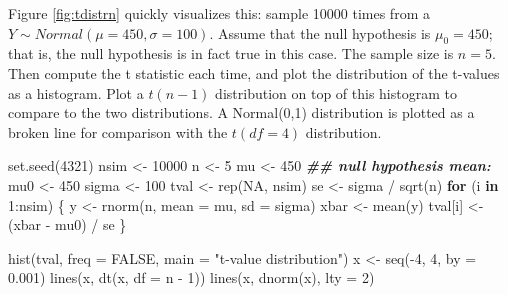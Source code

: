 \documentclass[
  12pt,
]{krantz}
\newenvironment{Shaded}{\begin{snugshade}}{\end{snugshade}}
\newcommand{\AttributeTok}[1]{\textcolor[rgb]{0.77,0.63,0.00}{#1}}
\newcommand{\ConstantTok}[1]{\textcolor[rgb]{0.00,0.00,0.00}{#1}}
\newcommand{\ControlFlowTok}[1]{\textcolor[rgb]{0.13,0.29,0.53}{\textbf{#1}}}
\newcommand{\DecValTok}[1]{\textcolor[rgb]{0.00,0.00,0.81}{#1}}
\newcommand{\DocumentationTok}[1]{\textcolor[rgb]{0.56,0.35,0.01}{\textbf{\textit{#1}}}}
\newcommand{\FloatTok}[1]{\textcolor[rgb]{0.00,0.00,0.81}{#1}}
\newcommand{\FunctionTok}[1]{\textcolor[rgb]{0.00,0.00,0.00}{#1}}
\newcommand{\NormalTok}[1]{#1}
\newcommand{\OtherTok}[1]{\textcolor[rgb]{0.56,0.35,0.01}{#1}}
\newcommand{\SpecialCharTok}[1]{\textcolor[rgb]{0.00,0.00,0.00}{#1}}
\newcommand{\StringTok}[1]{\textcolor[rgb]{0.31,0.60,0.02}{#1}}
\theoremstyle{definition}
\theoremstyle{definition}
\theoremstyle{definition}
\theoremstyle{definition}
\theoremstyle{remark}
\begin{document}
Figure \ref{fig:tdistrn} quickly visualizes this: sample 10000 times from a \(Y\sim Normal(\mu=450,\sigma=100)\). Assume that the null hypothesis is \(\mu_0=450\); that is, the null hypothesis is in fact true in this case. The sample size is \(n=5\). Then compute the t statistic each time, and plot the distribution of the t-values as a histogram. Plot a \(t(n-1)\) distribution on top of this histogram to compare to the two distributions. A Normal(0,1) distribution is plotted as a broken line for comparison with the \(t(df=4)\) distribution.

\begin{Shaded}
\begin{Highlighting}[]
\FunctionTok{set.seed}\NormalTok{(}\DecValTok{4321}\NormalTok{)}
\NormalTok{nsim }\OtherTok{\textless{}{-}} \DecValTok{10000}
\NormalTok{n }\OtherTok{\textless{}{-}} \DecValTok{5}
\NormalTok{mu }\OtherTok{\textless{}{-}} \DecValTok{450}
\DocumentationTok{\#\# null hypothesis mean:}
\NormalTok{mu0 }\OtherTok{\textless{}{-}} \DecValTok{450}
\NormalTok{sigma }\OtherTok{\textless{}{-}} \DecValTok{100}
\NormalTok{tval }\OtherTok{\textless{}{-}} \FunctionTok{rep}\NormalTok{(}\ConstantTok{NA}\NormalTok{, nsim)}
\NormalTok{se }\OtherTok{\textless{}{-}}\NormalTok{ sigma }\SpecialCharTok{/} \FunctionTok{sqrt}\NormalTok{(n)}
\ControlFlowTok{for}\NormalTok{ (i }\ControlFlowTok{in} \DecValTok{1}\SpecialCharTok{:}\NormalTok{nsim) \{}
\NormalTok{  y }\OtherTok{\textless{}{-}} \FunctionTok{rnorm}\NormalTok{(n, }\AttributeTok{mean =}\NormalTok{ mu, }\AttributeTok{sd =}\NormalTok{ sigma)}
\NormalTok{  xbar }\OtherTok{\textless{}{-}} \FunctionTok{mean}\NormalTok{(y)}
\NormalTok{  tval[i] }\OtherTok{\textless{}{-}}\NormalTok{ (xbar }\SpecialCharTok{{-}}\NormalTok{ mu0) }\SpecialCharTok{/}\NormalTok{ se}
\NormalTok{\}}

\FunctionTok{hist}\NormalTok{(tval, }\AttributeTok{freq =} \ConstantTok{FALSE}\NormalTok{, }\AttributeTok{main =} \StringTok{"t{-}value distribution"}\NormalTok{)}
\NormalTok{x }\OtherTok{\textless{}{-}} \FunctionTok{seq}\NormalTok{(}\SpecialCharTok{{-}}\DecValTok{4}\NormalTok{, }\DecValTok{4}\NormalTok{, }\AttributeTok{by =} \FloatTok{0.001}\NormalTok{)}
\FunctionTok{lines}\NormalTok{(x, }\FunctionTok{dt}\NormalTok{(x, }\AttributeTok{df =}\NormalTok{ n }\SpecialCharTok{{-}} \DecValTok{1}\NormalTok{))}
\FunctionTok{lines}\NormalTok{(x, }\FunctionTok{dnorm}\NormalTok{(x), }\AttributeTok{lty =} \DecValTok{2}\NormalTok{)}
\end{Highlighting}
\end{Shaded}
\end{document}
